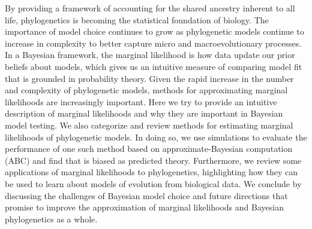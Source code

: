 By providing a framework of accounting for the shared ancestry inherent to all
life,
phylogenetics is becoming the statistical foundation of biology.
The importance of model choice continues to grow as phylogenetic models
continue to increase in complexity to better capture micro and
macroevolutionary processes.
In a Bayesian framework, 
the marginal likelihood is how data update our prior beliefs about models,
which gives us an intuitive measure of comparing model fit that is grounded in
probability theory.
Given the rapid increase in the number and complexity of phylogenetic models,
methods for approximating marginal likelihoods are increasingly important.
Here we try to provide an intuitive description of marginal likelihoods and why
they are important in Bayesian model testing.
We also categorize and review methods for estimating marginal likelihoods of
phylogenetic models.
In doing so, we use simulations to evaluate the performance of one such method
based on approximate-Bayesian computation (ABC) and find that  is biased as
predicted   theory.
Furthermore, we review some applications of marginal likelihoods to
phylogenetics, highlighting how they can be used to learn about models of
evolution from biological data.
We conclude by discussing the challenges of Bayesian model choice and future
directions that promise to improve the approximation of marginal likelihoods
and Bayesian phylogenetics as a whole.
